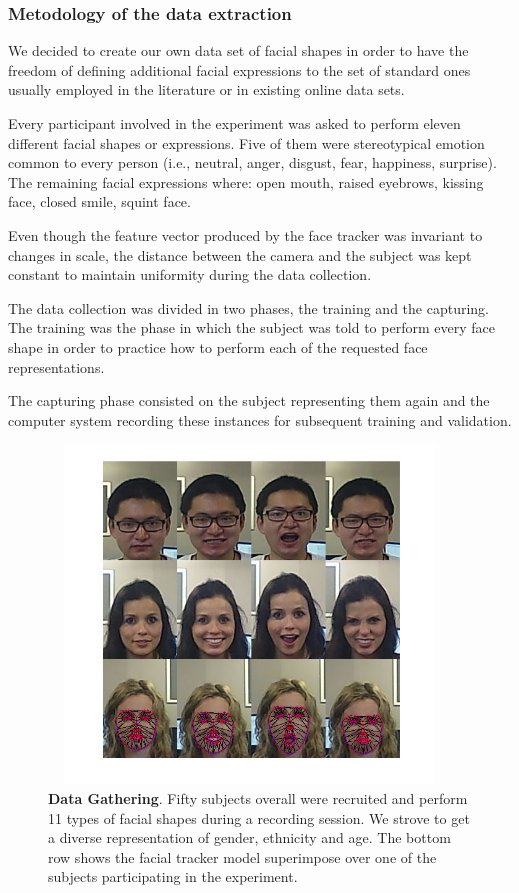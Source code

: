 \documentclass[]{article}
\begin{document}
\subsubsection{Metodology of the data extraction}
We decided to create our own data set of facial shapes in order to have the freedom of defining additional  facial expressions
to the set of standard ones usually employed in the literature or in existing online data sets. 

Every participant involved in the experiment was asked to perform eleven different facial shapes or expressions.
Five of them were stereotypical emotion common to every person (i.e., neutral, anger, disgust, fear, happiness,
surprise). The remaining facial expressions where: open mouth, raised eyebrows,
kissing face, closed smile, squint face.

Even though the feature vector produced  by the face tracker was invariant to changes in scale, the distance
between the camera and the subject was kept constant to maintain uniformity during the data collection.

The data collection was divided in two phases, the training and the capturing. The training was the phase in which the
subject was told to perform every face shape in order to practice how to perform each of the requested face
representations.

The capturing phase consisted on the subject representing them again and the computer system recording these instances
for subsequent training and validation. 

\begin{figure}[ht]
\begin{center}
\vspace{-3mm}
\includegraphics[width=0.95\textwidth,height=90mm]{figures/dataExtrationExamples.jpg}
\end{center}
\caption{\textbf{Data Gathering}. Fifty subjects overall were recruited  and perform 11 types of facial shapes during a recording session.
We strove to  get a diverse representation of gender, ethnicity and age. The bottom row shows the facial tracker model superimpose 
over one of the subjects participating in the experiment.}
\label{figureLabel}
\end{figure}
\end{document}
